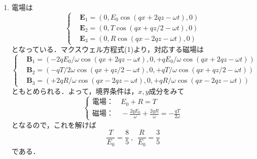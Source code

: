 \documentclass[a4paper,pdflatex,ja=standard]{bxjsarticle}
\begin{document}
\begin{enumerate}
  \item 
  電場は
  \begin{equation}
    \left\{\begin{alignedat}{1}
      &
      \bm{E}_{1}
      =(0,E_{0}\cos(qx+2qz-\omega t),0)
      \\
      &
      \bm{E}_{2}
      =(0,T\cos(qx+qz/2-\omega t),0)
      \\
      &
      \bm{E}_{3}
      =(0,R\cos(qx-2qz-\omega t),0)
    \end{alignedat}\right.
  \end{equation}
  となっている．マクスウェル方程式(1)より，対応する磁場は
  \begin{equation}
    \left\{\begin{alignedat}{1}
      &
      \bm{B}_{1}
      =
      (-2qE_{0}/\omega \cos(qx+2qz-\omega t),0,+qE_{0}/\omega \cos(qx+2qz-\omega t))
      \\
      &
      \bm{B}_{2}
      =
      (-qT/2\omega \cos(qx+qz/2-\omega t),0,+qT/\omega \cos(qx+qz/2-\omega t))
      \\
      &
      \bm{B}_{3}
      =
      (+2qR/\omega \cos(qx-2qz-\omega t),0,+qR/\omega \cos(qx-2qz-\omega t))
    \end{alignedat}\right.
  \end{equation}
  ともとめられる．よって，境界条件は，$x,y$成分をみて
  \begin{equation}
    \left\{\begin{alignedat}{1}
      \text{電場：}&\ 
      E_{0} + R = T
      \\
      \text{磁場：}&\  
      -\frac{2qE_{0}}{\omega}      
      +\frac{2qR}{\omega}
      =
      -\frac{qT}{2\omega}
    \end{alignedat}\right.
  \end{equation}
  となるので，これを解けば
  \begin{equation}
    \frac{T}{E_{0}}
    =
    \frac{8}{5}
    \ ,\ \ 
    \frac{R}{E_{0}}
    =
    \frac{3}{5}
  \end{equation}
  である．


\end{enumerate}
\end{document}
